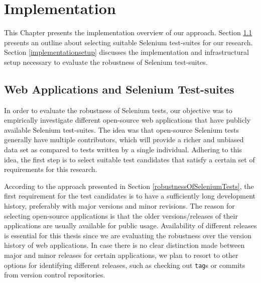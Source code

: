 \chapter{Implementation}
\label{Chapter4}

This Chapter presents the implementation overview of our approach. Section \ref{selectingCandidates} presents an outline about selecting suitable Selenium test-suites for our research. Section \ref{implementationsetup} discusses the implementation and infrastructural setup necessary to evaluate the robustness of Selenium test-suites. 


\section{Web Applications and Selenium Test-suites}
\label{selectingCandidates}
In order to evaluate the robustness of Selenium tests, our objective was to empirically investigate different open-source web applications that have publicly available Selenium test-suites. The idea was that open-source Selenium tests generally have multiple contributors, which will provide a richer and unbiased data set as compared to tests written by a single individual. Adhering to this idea, the first step is to select suitable test candidates that satisfy a certain set of requirements for this research. 

According to the approach presented in Section \ref{robustnessOfSeleniumTests}, the first requirement for the test candidates is to have a sufficiently long development history, preferably with major versions and minor revisions. The reason for selecting open-source applications is that the older versions/releases of their applications are usually available for public usage. Availability of different releases is essential for this thesis since we are evaluating the robustness over the version history of web applications. In case there is no clear distinction made between major and minor releases for certain applications, we plan to resort to other options for identifying different releases, such as checking out \texttt{tag}s or commits from version control repositories. 

